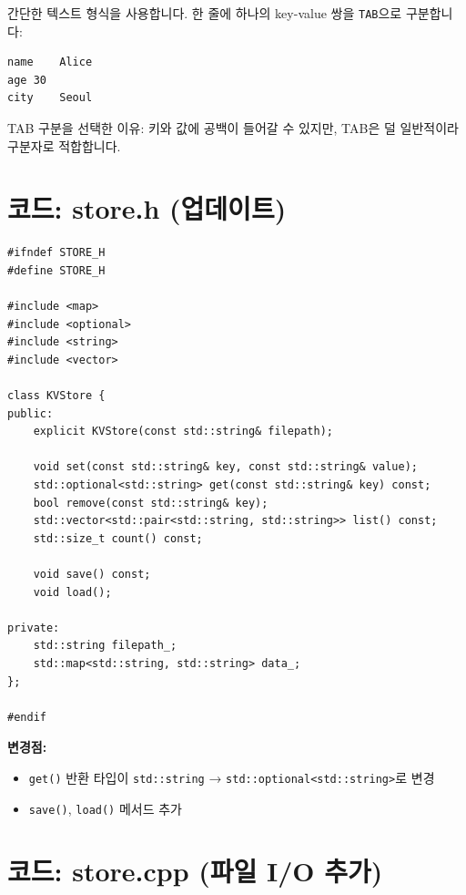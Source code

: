 \documentclass[11pt,a4paper]{book}
\newcommand{\file}[1]{\texttt{#1}}
\newcommand{\code}[1]{\texttt{#1}}
\begin{document}
간단한 텍스트 형식을 사용합니다. 한 줄에 하나의 key-value 쌍을 \code{TAB}으로 구분합니다:

\begin{lstlisting}[style=shell,numbers=none]
name	Alice
age	30
city	Seoul
\end{lstlisting}

TAB 구분을 선택한 이유: 키와 값에 공백이 들어갈 수 있지만, TAB은 덜 일반적이라 구분자로 적합합니다.

\section{코드: store.h (업데이트)}

\begin{lstlisting}[style=cpp,title={\file{src/store.h} (업데이트)}]
#ifndef STORE_H
#define STORE_H

#include <map>
#include <optional>
#include <string>
#include <vector>

class KVStore {
public:
    explicit KVStore(const std::string& filepath);

    void set(const std::string& key, const std::string& value);
    std::optional<std::string> get(const std::string& key) const;
    bool remove(const std::string& key);
    std::vector<std::pair<std::string, std::string>> list() const;
    std::size_t count() const;

    void save() const;
    void load();

private:
    std::string filepath_;
    std::map<std::string, std::string> data_;
};

#endif
\end{lstlisting}

\textbf{변경점:}
\begin{itemize}[nosep]
\item \code{get()} 반환 타입이 \code{std::string} → \code{std::optional<std::string>}로 변경
\item \code{save()}, \code{load()} 메서드 추가
\end{itemize}

\section{코드: store.cpp (파일 I/O 추가)}
\end{document}
